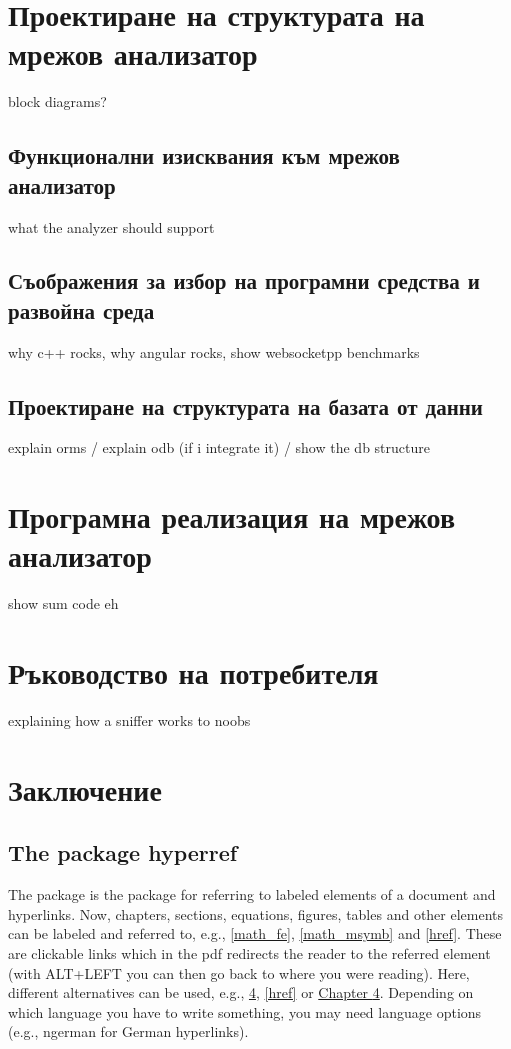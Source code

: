\documentclass[9pt,a4paper,oneside]{extbook}
\begin{document}
\chapter{Проектиране на структурата на мрежов анализатор}
block diagrams?
\section{Функционални изисквания към мрежов анализатор}
what the analyzer should support
\section{Съображения за избор на програмни средства и развойна среда}

why c++ rocks, why angular rocks, show websocketpp benchmarks
\section{Проектиране на структурата на базата от данни}

explain orms / explain odb (if i integrate it) / show the db structure

\chapter{Програмна реализация на мрежов анализатор}

show sum code eh

\chapter{Ръководство на потребителя}

explaining how a sniffer works to noobs

\chapter{Заключение}
\label{href}

\section{The package hyperref}

The package  is the package for referring to labeled elements of a document and hyperlinks. Now, chapters, sections, equations, figures, tables and other elements can be labeled and referred to, e.g., \autoref{math_fe}, \autoref{math_msymb} and \autoref{href}. These are clickable links which in the pdf redirects the reader to the referred element (with ALT+LEFT you can then go back to where you were reading). Here, different alternatives can be used, e.g., \ref{href}, \autoref{href} or \hyperref[href]{Chapter \ref*{href}}. Depending on which language you have to write something, you may need language options (e.g., ngerman for German hyperlinks).
\end{document}
